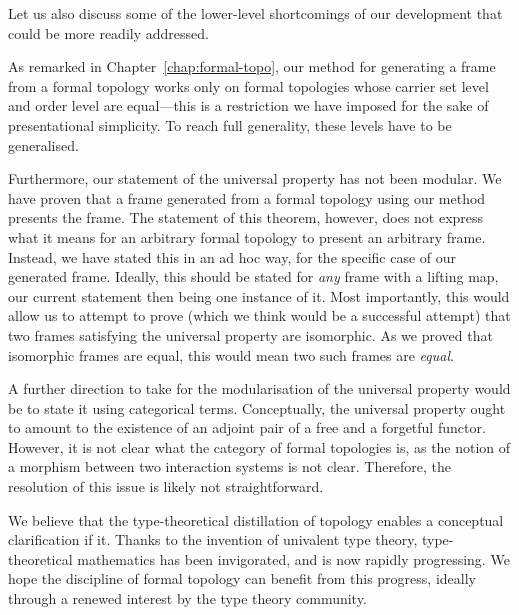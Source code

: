Let us also discuss some of the lower-level shortcomings of our development that could be
more readily addressed.

As remarked in Chapter~\ref{chap:formal-topo}, our method for generating a frame from a
formal topology works only on formal topologies whose carrier set level and order level
are equal---this is a restriction we have imposed for the sake of presentational simplicity.
To reach full generality, these levels have to be generalised.

Furthermore, our statement of the universal property has not been modular. We have proven
that a frame generated from a formal topology using our method presents the frame. The
statement of this theorem, however, does not express what it means for an arbitrary formal
topology to present an arbitrary frame. Instead, we have stated this in an ad hoc way, for
the specific case of our generated frame. Ideally, this should be stated for \emph{any}
frame with a lifting map, our current statement then being one instance of it. Most
importantly, this would allow us to attempt to prove (which we think would be a successful
attempt) that two frames satisfying the universal property are isomorphic. As we proved
that isomorphic frames are equal, this would mean two such frames are \emph{equal}.

A further direction to take for the modularisation of the universal property would be to
state it using categorical terms. Conceptually, the universal property ought to amount to
the existence of an adjoint pair of a free and a forgetful functor. However, it is not
clear what the category of formal topologies is, as the notion of a morphism between two
interaction systems is not clear. Therefore, the resolution of this issue is likely not
straightforward.

We believe that the type-theoretical distillation of topology enables a conceptual
clarification if it. Thanks to the invention of univalent type theory, type-theoretical
mathematics has been invigorated, and is now rapidly progressing. We hope the discipline
of formal topology can benefit from this progress, ideally through a renewed interest by
the type theory community.
